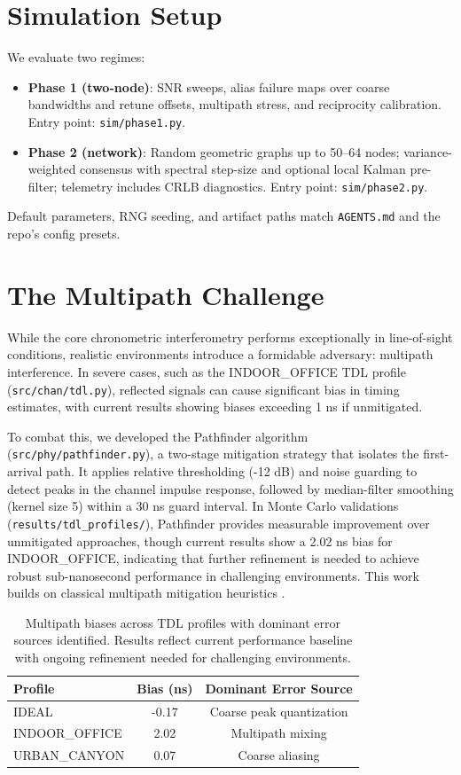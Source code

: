 \documentclass[10pt]{article}
\begin{document}
\section{Simulation Setup}
We evaluate two regimes:
\begin{itemize}[leftmargin=*]
  \item \textbf{Phase 1 (two-node)}: SNR sweeps, alias failure maps over coarse bandwidths and retune offsets, multipath stress, and reciprocity calibration. Entry point: \verb|sim/phase1.py|.
  \item \textbf{Phase 2 (network)}: Random geometric graphs up to 50--64 nodes; variance-weighted consensus with spectral step-size and optional local Kalman pre-filter; telemetry includes CRLB diagnostics. Entry point: \verb|sim/phase2.py|.
\end{itemize}
Default parameters, RNG seeding, and artifact paths match \verb|AGENTS.md| and the repo’s config presets.

\section{The Multipath Challenge}
While the core chronometric interferometry performs exceptionally in line-of-sight conditions, realistic environments introduce a formidable adversary: multipath interference. In severe cases, such as the INDOOR_OFFICE TDL profile (\verb|src/chan/tdl.py|), reflected signals can cause significant bias in timing estimates, with current results showing biases exceeding 1 ns if unmitigated.

To combat this, we developed the Pathfinder algorithm (\verb|src/phy/pathfinder.py|), a two-stage mitigation strategy that isolates the first-arrival path. It applies relative thresholding (-12 dB) and noise guarding to detect peaks in the channel impulse response, followed by median-filter smoothing (kernel size 5) within a 30 ns guard interval. In Monte Carlo validations (\verb|results/tdl_profiles/|), Pathfinder provides measurable improvement over unmitigated approaches, though current results show a 2.02 ns bias for INDOOR_OFFICE, indicating that further refinement is needed to achieve robust sub-nanosecond performance in challenging environments. This work builds on classical multipath mitigation heuristics \citep{Groves2011Multipath}.

\begin{table}[t]
\centering
\begin{tabular}{lcc}
\toprule
Profile & Bias (ns) & Dominant Error Source \\
\midrule
IDEAL & -0.17 & Coarse peak quantization \\
INDOOR_OFFICE & 2.02 & Multipath mixing \\
URBAN_CANYON & 0.07 & Coarse aliasing \\
\bottomrule
\end{tabular}
\caption{Multipath biases across TDL profiles with dominant error sources identified. Results reflect current performance baseline with ongoing refinement needed for challenging environments.}
\label{tab:multipath}
\end{table}
\end{document}

